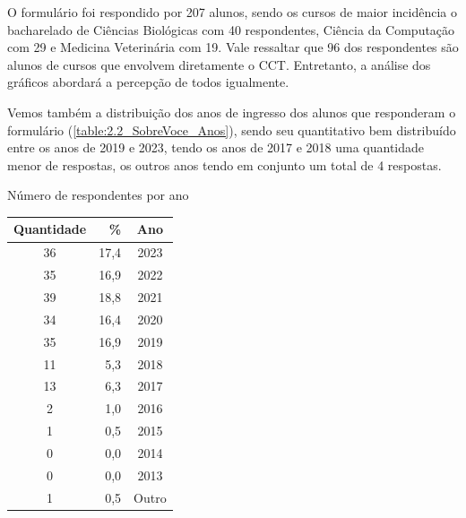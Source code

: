 \begin{apendicesenv}

  O formulário foi respondido por 207 alunos, sendo os cursos de maior incidência o bacharelado de Ciências Biológicas com 40 respondentes, Ciência da Computação com 29 e Medicina Veterinária com 19. Vale ressaltar que 96 dos respondentes são alunos de cursos que envolvem diretamente o CCT. Entretanto, a análise dos gráficos abordará a percepção de todos igualmente.

  Vemos também a distribuição dos anos de ingresso dos alunos que responderam o formulário (\autoref{table:2.2_SobreVoce_Anos}), sendo seu quantitativo bem distribuído entre os anos de 2019 e 2023, tendo os anos de 2017 e 2018 uma quantidade menor de respostas, os outros anos tendo em conjunto um total de 4 respostas.

  \begin{CenteredTable} \caption{Número de respondentes por ano} \label{table:2.2_SobreVoce_Anos}
    \begin{tabular}{| c r c |}
      \hline
      \textbf{Quantidade} & \%   & \textbf{Ano} \\
      \hline
      36                  & 17,4 & 2023         \\
      35                  & 16,9 & 2022         \\
      39                  & 18,8 & 2021         \\
      34                  & 16,4 & 2020         \\
      35                  & 16,9 & 2019         \\
      11                  & 5,3  & 2018         \\
      13                  & 6,3  & 2017         \\
      2                   & 1,0  & 2016         \\
      1                   & 0,5  & 2015         \\
      0                   & 0,0  & 2014         \\
      0                   & 0,0  & 2013         \\
      1                   & 0,5  & Outro        \\
      \hline
    \end{tabular}
  \end{CenteredTable}


\end{apendicesenv}
